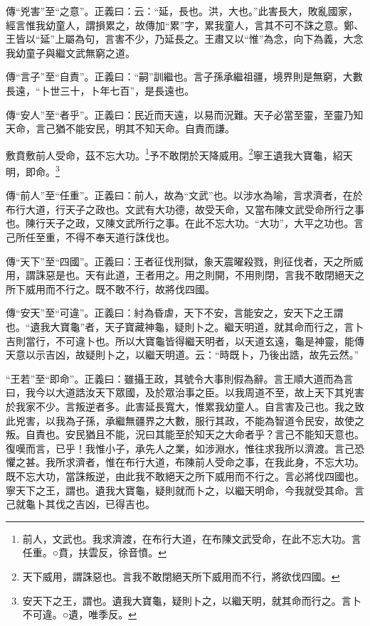 {\noindent\zhuan{}\fzbyks 傳“兇害”至“之意”。正義曰：云：“延，長也。洪，大也。”此害長大，敗亂國家，經言惟我幼童人，謂損累之，故傳加“累”字，累我童人，言其不可不誅之意。鄭、王皆以“延”上屬為句，言害不少，乃延長之。王肅又以“惟”為念，向下為義，大念我幼童子與繼文武無窮之道。 \par}

{\noindent\zhuan{}\fzbyks 傳“言子”至“自責”。正義曰：“嗣”訓繼也。言子孫承繼祖疆，境界則是無窮，大數長遠，“卜世三十，卜年七百”，是長遠也。 \par}

{\noindent\zhuan{}\fzbyks 傳“安人”至“者乎”。正義曰：民近而天遠，以易而況難。天子必當至靈，至靈乃知天命，言己猶不能安民，明其不知天命。自責而謙。 \par}

敷賁敷前人受命，茲不忘大功。\footnote{前人，文武也。我求濟渡，在布行大道，在布陳文武受命，在此不忘大功。言任重。○賁，扶雲反，徐音憤。}予不敢閉於天降威用。\footnote{天下威用，謂誅惡也。言我不敢閉絕天所下威用而不行，將欲伐四國。}寧王遺我大寶龜，紹天明，即命。\footnote{安天下之王，謂也。遺我大寶龜，疑則卜之，以繼天明，就其命而行之。言卜不可違。○遺，唯季反。}

{\noindent\zhuan{}\fzbyks 傳“前人”至“任重”。正義曰：前人，故為“文武”也。以涉水為喻，言求濟者，在於布行大道，行天子之政也。文武有大功德，故受天命，又當布陳文武受命所行之事也。陳行天子之政，又陳文武所行之事。在此不忘大功。“大功”，大平之功也。言己所任至重，不得不奉天道行誅伐也。 \par}

{\noindent\zhuan{}\fzbyks 傳“天下”至“四國”。正義曰：王者征伐刑獄，象天震曜殺戮，則征伐者，天之所威用，謂誅惡是也。天有此道，王者用之。用之則開，不用則閉，言我不敢閉絕天之所下威用而不行之。既不敢不行，故將伐四國。 \par}

{\noindent\zhuan{}\fzbyks 傳“安天”至“可違”。正義曰：紂為昏虐，天下不安，言能安之，安天下之王謂也。“遺我大寶龜”者，天子寶藏神龜，疑則卜之。繼天明道，就其命而行之，言卜吉則當行，不可違卜也。所以大寶龜皆得繼天明者，以天道玄遠，龜是神靈，能傳天意以示吉凶，故疑則卜之，以繼天明道。云：“時既卜，乃後出誥，故先云然。” \par}

{\noindent\shu{}\fzkt “王若”至“即命”。正義曰：雖攝王政，其號令大事則假為辭。言王順大道而為言曰，我今以大道誥汝天下眾國，及於眾治事之臣。以我周道不至，故上天下其兇害於我家不少。言叛逆者多。此害延長寬大，惟累我幼童人。自言害及己也。我之致此兇害，以我為子孫，承繼無疆界之大數，服行其政，不能為智道令民安，故使之叛。自責也。安民猶且不能，況曰其能至於知天之大命者乎？言己不能知天意也。復嘆而言，已乎！我惟小子，承先人之業，如涉淵水，惟往求我所以濟渡。言己恐懼之甚。我所求濟者，惟在布行大道，布陳前人受命之事，在我此身，不忘大功。既不忘大功，當誅叛逆，由此我不敢絕天之所下威用而不行之。言必將伐四國也。寧天下之王，謂也。遺我大寶龜，疑則就而卜之，以繼天明命，今我就受其命。言己就龜卜其伐之吉凶，已得吉也。 \par}

